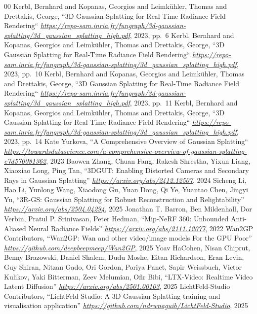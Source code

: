 \documentclass[conference]{IEEEtran}
\begin{document}
\begin{thebibliography}{00}
 Kerbl, Bernhard and Kopanas, Georgios and Leimk{\"u}hler, Thomas and Drettakis, George, ``3D Gaussian Splatting for Real-Time Radiance Field Rendering`` \emph{\url{https://repo-sam.inria.fr/fungraph/3d-gaussian-splatting/3d_gaussian_splatting_high.pdf}}, 2023, pp.~6
 Kerbl, Bernhard and Kopanas, Georgios and Leimk{\"u}hler, Thomas and Drettakis, George, ``3D Gaussian Splatting for Real-Time Radiance Field Rendering`` \emph{\url{https://repo-sam.inria.fr/fungraph/3d-gaussian-splatting/3d_gaussian_splatting_high.pdf}}, 2023, pp.~10
 Kerbl, Bernhard and Kopanas, Georgios and Leimk{\"u}hler, Thomas and Drettakis, George, ``3D Gaussian Splatting for Real-Time Radiance Field Rendering`` \emph{\url{https://repo-sam.inria.fr/fungraph/3d-gaussian-splatting/3d_gaussian_splatting_high.pdf}}, 2023, pp.~11
 Kerbl, Bernhard and Kopanas, Georgios and Leimk{\"u}hler, Thomas and Drettakis, George, ``3D Gaussian Splatting for Real-Time Radiance Field Rendering`` \emph{\url{https://repo-sam.inria.fr/fungraph/3d-gaussian-splatting/3d_gaussian_splatting_high.pdf}}, 2023, pp.~14
 Kate Yurkova, ``A Comprehensive Overview of Gaussian Splatting`` \emph{\url{https://towardsdatascience.com/a-comprehensive-overview-of-gaussian-splatting-e7d570081362}}, 2023
 Baowen Zhang, Chuan Fang, Rakesh Shrestha, Yixun Liang, Xiaoxiao Long, Ping Tan, ``3DGUT: Enabling Distorted Cameras and Secondary Rays in Gaussian Splatting'' \emph{\url{https://arxiv.org/abs/2412.12507}}, 2024
 Sicheng Li, Hao Li, Yunlong Wang, Xiaodong Gu, Yuan Dong, Qi Ye, Yuantao Chen, Jingyi Yu, ``3R-GS: Gaussian Splatting for Robust Reconstruction and Relightability'' \emph{\url{https://arxiv.org/abs/2504.04294}}, 2025
 Jonathan T. Barron, Ben Mildenhall, Dor Verbin, Pratul P. Srinivasan, Peter Hedman, ``Mip-NeRF 360: Unbounded Anti-Aliased Neural Radiance Fields'' \emph{\url{https://arxiv.org/abs/2111.12077}}, 2022
 Wan2GP Contributors, ``Wan2GP: Wan and other video/image models For the GPU Poor'' \emph{\url{https://github.com/deepbeepmeep/Wan2GP}}, 2025
 Yoav HaCohen, Nisan Chiprut, Benny Brazowski, Daniel Shalem, Dudu Moshe, Eitan Richardson, Eran Levin, Guy Shiran, Nitzan Gado, Ori Gordon, Poriya Panet, Sapir Weissbuch, Victor Kulikov, Yaki Bitterman, Zeev Melumian, Ofir Bibi, ``LTX-Video: Realtime Video Latent Diffusion'' \emph{\url{https://arxiv.org/abs/2501.00103}}, 2025
 LichtFeld-Studio Contributors, ``LichtFeld-Studio: A 3D Gaussian Splatting training and visualisation application'' \emph{\url{https://github.com/ndrwnaguib/LichtFeld-Studio}}, 2025


\end{thebibliography}
\end{document}
